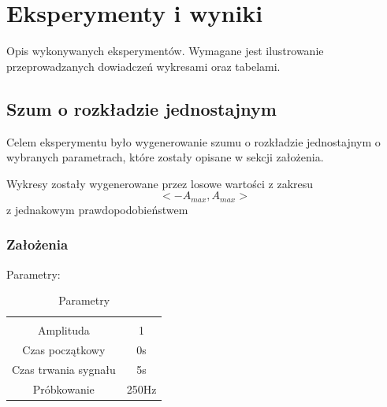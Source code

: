 \documentclass{article}
\begin{document}
\section{Eksperymenty i wyniki}

Opis wykonywanych eksperymentów. Wymagane jest ilustrowanie przeprowadzanych dowiadczeń wykresami oraz tabelami.


\subsection{Szum o rozkładzie jednostajnym} \label{szumjednostajny} 
    Celem eksperymentu było wygenerowanie szumu o rozkładzie jednostajnym o wybranych parametrach,
    które zostały opisane w sekcji założenia.

    
        Wykresy zostały wygenerowane przez losowe wartości z zakresu \[<-A_{max}, A_{max}>\]
        z jednakowym prawdopodobieństwem
    \noindent
    \subsubsection{Założenia}
    Parametry:
    
    \begin{table}[h!]
        \centering
        \vspace{0.2cm}
        \begin{tabular}{|c|c|}
            \hline\hline\\[-0.4cm]
            Amplituda & 1  \\
            \hline
            Czas początkowy & 0s  \\
            \hline
            Czas trwania sygnału & 5s  \\
            \hline
            Próbkowanie & 250Hz \\
            \hline
        \end{tabular}
        \caption{Parametry}
        \label{szumjednostajny}
    \end{table}
    \FloatBarrier
\end{document}
